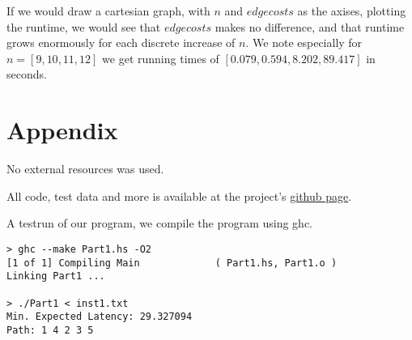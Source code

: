 \documentclass[a4paper,11pt]{article}
\begin{document}
If we would draw a cartesian graph, with $n$ and $edgecosts$ as the axises, plotting the runtime,
we would see that $edgecosts$ makes no difference, and that runtime grows enormously for each
discrete increase of $n$. We note especially for $n = [9, 10, 11, 12]$ we get running times
of $[0.079, 0.594, 8.202, 89.417]$ in seconds.

\section{Appendix}
No external resources was used.

All code, test data and more is available at the project's \href{https://github.com/bisforboman/Algorithms-TIN092}{github page}.

A testrun of our program, we compile the program using ghc.

\begin{lstlisting}
> ghc --make Part1.hs -O2
[1 of 1] Compiling Main             ( Part1.hs, Part1.o )
Linking Part1 ...

> ./Part1 < inst1.txt 
Min. Expected Latency: 29.327094
Path: 1 4 2 3 5

\end{lstlisting}
\end{document}
